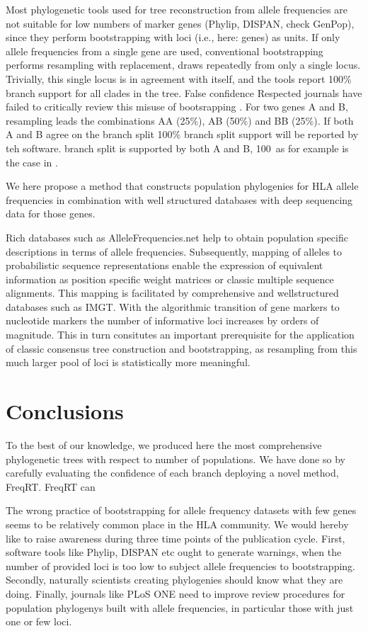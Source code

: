 \documentclass{article}
\begin{document}
Most phylogenetic tools used for tree reconstruction from allele frequencies are not suitable for low numbers of marker
genes (Phylip, DISPAN, check GenPop), since they perform bootstrapping with loci (i.e., here: genes) as units.
If only allele frequencies from a single gene are used, conventional bootstrapping performs resampling with replacement,
draws repeatedly from only a single locus. Trivially, this single locus is in agreement with itself, and the tools
report 100\% branch support for all clades in the tree.
False confidence
Respected journals have failed to critically review this misuse of bootsrapping \cite{ArnaizVillena2017Jan,Hajjej2018Mar}.
For two genes A and B, resampling leads the combinations AA (25\%), AB (50\%) and BB (25\%). If both A and B agree on the branch split
100\% branch split support will be reported by teh software. branch split is
supported by both A and B, 100\
as for example is the case in \cite{Hajjej2018Mar}.


We here propose a method that constructs population phylogenies for HLA allele frequencies in combination with well structured databases
with deep sequencing data for those genes.

Rich databases such as AlleleFrequencies.net help to obtain population specific descriptions in terms of allele
frequencies. Subsequently, mapping of alleles to probabilistic sequence representations enable
the expression of equivalent information as position specific weight matrices or classic multiple sequence alignments.
 This mapping is facilitated by comprehensive and wellstructured databases such as IMGT.
With the algorithmic transition of gene markers to nucleotide markers
the number of informative loci increases by orders of magnitude.
This in turn consitutes an important prerequisite for the application of classic consensus tree construction and
bootstrapping, as resampling from this much larger pool of loci is
statistically more meaningful.



\section{Conclusions}

To the best of our knowledge, we produced here the most comprehensive phylogenetic trees with respect to number of populations.
We have done so by carefully evaluating the confidence of each branch deploying a novel method, FreqRT.
FreqRT can


The wrong practice of bootstrapping for allele frequency datasets with few genes seems to be relatively common place in the HLA community.
We would hereby like to raise awareness during three time points of the publication cycle. First, software tools like
Phylip, DISPAN etc ought to generate warnings, when the number of provided loci is too low to subject allele frequencies to
bootstrapping. Secondly, naturally scientists creating phylogenies should know what they are doing. Finally, journals like
PLoS ONE need to improve review procedures for population phylogenys built with allele frequencies, in particular those with
just one or few loci.



\end{document}
